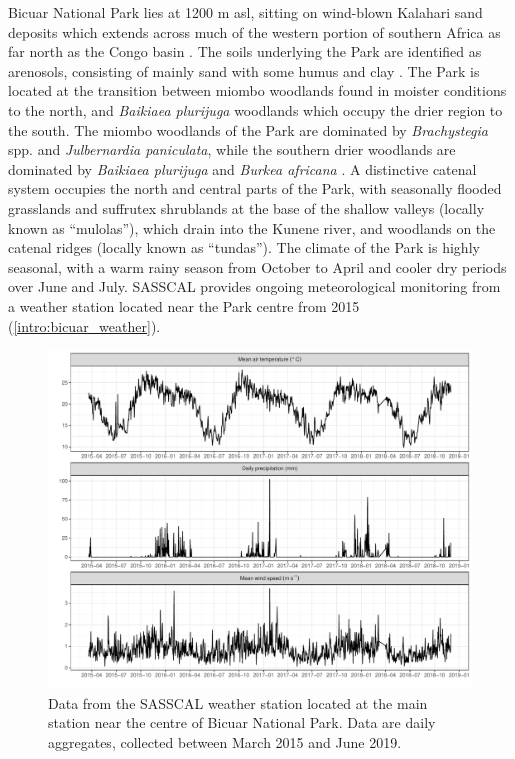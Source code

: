 \begin{refsection}
Bicuar National Park lies at \textapprox{}1200 m asl, sitting on wind-blown Kalahari sand deposits which extends across much of the western portion of southern Africa as far north as the Congo basin \citep{Shaw2002}. The soils underlying the Park are identified as arenosols, consisting of mainly sand with some humus and clay \citep{Jones2013, Hartemink2008}. The Park is located at the transition between miombo woodlands found in moister conditions to the north, and \textit{Baikiaea plurijuga} woodlands which occupy the drier region to the south. The miombo woodlands of the Park are dominated by \textit{Brachystegia} spp. and \textit{Julbernardia paniculata}, while the southern drier woodlands are dominated by \textit{Baikiaea plurijuga} and \textit{Burkea africana} \citep{Teixeira1968}. A distinctive catenal system occupies the north and central parts of the Park, with seasonally flooded grasslands and suffrutex shrublands at the base of the shallow valleys (locally known as ``mulolas''), which drain into the Kunene river, and woodlands on the catenal ridges (locally known as ``tundas''). The climate of the Park is highly seasonal, with a warm rainy season from October to April and cooler dry periods over June and July. SASSCAL provides ongoing meteorological monitoring from a weather station located near the Park centre from 2015 (\autoref{intro:bicuar_weather}).

\begin{figure}[tb]
\centering
	\includegraphics[width=\textwidth]{img/bicuar_weather}
	\caption[Bicuar National Park climate time series]{Data from the SASSCAL weather station located at the main station near the centre of Bicuar National Park. Data are daily aggregates, collected between March 2015 and June 2019.} 
	\label{intro:bicuar_weather}
\end{figure}


\end{refsection}
